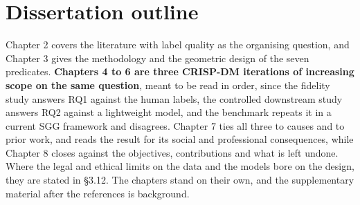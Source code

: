 \section{Dissertation outline}

Chapter 2 covers the literature with label quality as the organising question, and Chapter 3 gives the methodology and the geometric design of the seven predicates. \textbf{Chapters 4 to 6 are three CRISP-DM iterations of increasing scope on the same question}, meant to be read in order, since the fidelity study answers RQ1 against the human labels, the controlled downstream study answers RQ2 against a lightweight model, and the benchmark repeats it in a current SGG framework and disagrees. Chapter 7 ties all three to causes and to prior work, and reads the result for its social and professional consequences, while Chapter 8 closes against the objectives, contributions and what is left undone. Where the legal and ethical limits on the data and the models bore on the design, they are stated in \S{}3.12. The chapters stand on their own, and the supplementary material after the references is background.